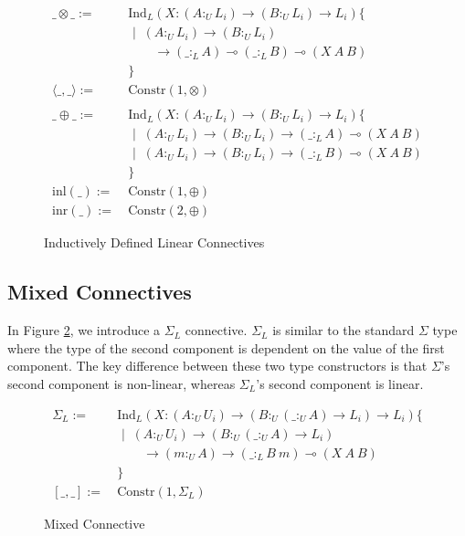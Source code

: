 \documentclass[sigplan,screen,review,anonymous]{acmart}
\newcommand{\ind}[1]{\text{Ind}_{#1}}
\newcommand{\constr}{\text{Constr}}
\newcommand{\sep}{\text{ | }}
\newcommand{\utype}{:_{\scriptscriptstyle U}}
\newcommand{\ltype}{:_{\scriptscriptstyle L}}
\newcommand{\lrangle}[1]{\langle #1 \rangle}
\newcommand{\SigmaL}{\Sigma_{\scriptscriptstyle L}}
\newcommand{\inl}{\text{inl}}
\newcommand{\inr}{\text{inr}}
\begin{document}
\begin{figure}[h]
  \caption{Inductively Defined Linear Connectives}
  \begin{align*}
    \_\otimes\_ :=\
     & \ind{L}(X : (A \utype L_i) \rightarrow (B \utype L_i) \rightarrow L_i)\{      \\
     & \sep\ (A \utype L_i) \rightarrow (B \utype L_i)                               \\
     & \qquad \rightarrow (\_ \ltype A)  \multimap (\_ \ltype B) \multimap (X\ A\ B) \\
     & \}
    \\
    \lrangle{\_,\_} := \
     & \constr(1, \otimes)
    \\\\
    \_\oplus\_ := \
     & \ind{L}(X : (A \utype L_i) \rightarrow (B \utype L_i) \rightarrow L_i)\{      \\
     & \sep \ (A \utype L_i) \rightarrow (B \utype L_i)
    \rightarrow (\_ \ltype A)  \multimap (X\ A\ B)                                   \\
     & \sep \ (A \utype L_i) \rightarrow (B \utype L_i)
    \rightarrow (\_ \ltype B)  \multimap (X\ A\ B)                                   \\
     & \}
    \\
    \inl(\_) := \
     & \constr(1, \oplus)
    \\
    \inr(\_) := \
     & \constr(2, \oplus)
  \end{align*}
  \Description{}
  \label{lconnectives}
\end{figure}

\subsection{Mixed Connectives}
In Figure \ref{mconnectives}, we introduce a $\SigmaL$ connective. $\SigmaL$ is similar to the standard $\Sigma$ type where the type of the second component is dependent on the value of the first component. The key difference between these two type constructors is that $\Sigma$'s second component is non-linear, whereas $\SigmaL$'s second component is linear.

\begin{figure}[h]
  \caption{Mixed Connective}
  \begin{align*}
    \SigmaL := \
     & \ind{L}(X : (A \utype U_i) \rightarrow
    (B \utype (\_ \utype A) \rightarrow L_i) \rightarrow L_i)\{ \\
     & \sep \ (A \utype U_i) \rightarrow
    (B \utype (\_ \utype A) \rightarrow L_i)                    \\
     & \qquad \rightarrow (m \utype A) \rightarrow
    (\_ \ltype B\ m) \multimap (X\ A\ B)                        \\
     & \}
    \\
    [\_,\_] :=\
     & \constr(1, \SigmaL)
  \end{align*}
  \Description{}
  \label{mconnectives}
\end{figure}
\end{document}
